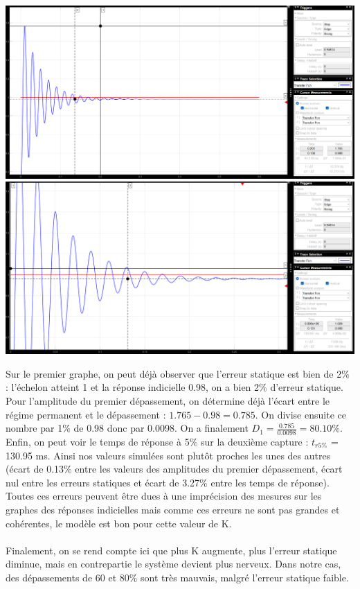 \documentclass[12pt]{article}
\begin{document}
\begin{center}
    \includegraphics[width = 19 cm]{TP2 Simulink/Syst_2/depassement_4_1_K=24.5.png}
    \includegraphics[width = 19 cm]{TP2 Simulink/Syst_2/tr5prct_4.1_K=24.5.png}
\end{center}
    Sur le premier graphe, on peut déjà observer que l'erreur statique est bien de 2$\%$ : l'échelon atteint 1 et la réponse indicielle 0.98, on a bien 2$\%$ d'erreur statique.
    Pour l'amplitude du premier dépassement, on détermine déjà l'écart entre le régime permanent et le dépassement : $1.765 -0.98 = 0.785$. On divise ensuite ce nombre par 1$\%$ de 0.98 donc par 0.0098.
    On a finalement $D_1 = \frac{0.785}{0.0098} = 80.10\%$. Enfin, on peut voir le temps de réponse à 5$\%$ sur la deuxième capture : $t_{r5\%}$ = 130.95 ms.
    Ainsi nos valeurs simulées sont plutôt proches les unes des autres (écart de 0.13$\%$ entre les valeurs des amplitudes du premier dépassement, écart nul entre les erreurs statiques et écart de 3.27$\%$ entre les temps de réponse). Toutes ces erreurs peuvent être dues à une imprécision des mesures sur les graphes des réponses indicielles mais comme ces erreurs ne sont pas grandes et cohérentes, le modèle est bon pour cette valeur de K.
\\\\Finalement, on se rend compte ici que plus K augmente, plus l'erreur statique diminue, mais en contrepartie le système devient plus nerveux. Dans notre cas, des dépassements de 60 et 80$\%$ sont très mauvais, malgré l'erreur statique faible.
\newpage
\end{document}
